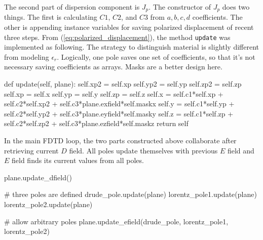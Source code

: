 The second part of dispersion component is $J_p$. The constructor of $J_p$ does two things. The first is calculating
$C1$, $C2$, and $C3$ from $a,b,c,d$ coefficients. The other is appending instance variables for saving polarized
displacement of recent three steps. From (\ref{eq:polarized_displacement}), the method \texttt{update} was implemented
as following. The strategy to distinguish material is slightly different from modeling $\epsilon_r$. Logically, one pole
saves one set of coefficients, so that it's not necessary saving coefficients as arrays. Masks are a better design here.
\begin{code}
    def update(self, plane):
        self.xp2 = self.xp
        self.yp2 = self.yp
        self.zp2 = self.zp
        self.xp = self.x
        self.yp = self.y
        self.zp = self.z
        self.x = self.c1*self.xp + self.c2*self.xp2 + self.c3*plane.exfield*self.maskx
        self.y = self.c1*self.yp + self.c2*self.yp2 + self.c3*plane.eyfield*self.masky
        self.z = self.c1*self.zp + self.c2*self.zp2 + self.c3*plane.ezfield*self.maskz
        return self
\end{code}
In the main FDTD loop, the two parts constructed above collaborate after retrieving current $D$ field. All poles update
themselves with previous $E$ field and $E$ field finds its current values from all poles.
\begin{code}
  plane.update_dfield()

  # three poles are defined 
  drude_pole.update(plane)
  lorentz_pole1.update(plane)
  lorentz_pole2.update(plane)

  # allow arbitrary poles 
  plane.update_efield(drude_pole, lorentz_pole1, lorentz_pole2) 
\end{code}
